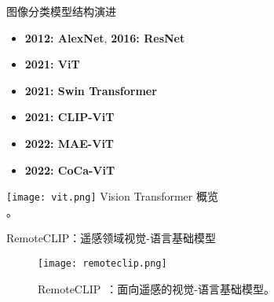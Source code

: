 \begin{refsection}
  \begin{frame}{图像分类模型结构演进}
    \begin{minipage}{0.48\linewidth}
      {\small
      \begin{itemize}
        \item \textbf{2012: AlexNet}, \textbf{2016: ResNet}
        \item \textbf{2021: ViT}
        \item \textbf{2021: Swin Transformer} \\
        \parencite{liuSwinTransformerHierarchical2021}
        \parencite{dosovitskiyImageWorth16x162020}
        \item \textbf{2021: CLIP-ViT} \\
        \parencite{radfordLearningTransferableVisual2021}
        \item \textbf{2022: MAE-ViT} \\
        \parencite{heMaskedAutoencodersAre2022}
        \item \textbf{2022: CoCa-ViT} \\
        \parencite{yuCoCaContrastiveCaptioners2022}
      \end{itemize}
      }
    \end{minipage}%
    \hfill
    \begin{minipage}{0.48\linewidth}
      \centering
      \texttt{[image: vit.png]}
      \scriptsize Vision Transformer 概览\\\parencite{dosovitskiyImageWorth16x162020}。
    \end{minipage}
    \bottomleftrefs
  \end{frame}
\end{refsection}

\begin{refsection}
  \begin{frame}{RemoteCLIP：遥感领域视觉-语言基础模型}
    \begin{figure}
      \centering
      \texttt{[image: remoteclip.png]}
      \caption{\scriptsize RemoteCLIP~\parencite{liuRemoteCLIPVisionLanguage2024}：面向遥感的视觉-语言基础模型。}
    \end{figure}
    \bottomleftrefs
  \end{frame}
\end{refsection}


